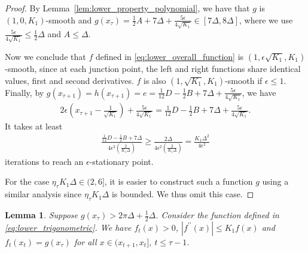 \documentclass{article}
\newtheorem{lemma}{Lemma}
\newcommand{\paren}[1]{\left( #1 \right)}
\begin{document}
\begin{proof}
By Lemma~\ref{lem:lower_property_polynomial}, 
we have that
$g$ is $(1,0,K_1)$-smooth and
$g(x_\tau)=\frac{1}{2}A+7\Delta+\frac{5\epsilon}{4\sqrt{K_1}}\in[7\Delta,8\Delta]$, where we use $\frac{5\epsilon}{4\sqrt{K_1}}\leq \frac{1}{2}\Delta$ and $A\leq\Delta$.

Now we conclude that $f$ defined in \eqref{eq:lower_overall_function} is $(1,\epsilon\sqrt{K_1},K_1)$-smooth,
since at each junction point,
the left and right functions share identical values, first and second derivatives.
$f$ is also $(1,\sqrt{K_1},K_1)$-smooth if $\epsilon\leq 1$.
Finally, by $g(x_{\tau+1})=h(x_{\tau+1})=e=\frac{1}{12}D-\frac{1}{2}B+7\Delta+\frac{5\epsilon}{4\sqrt{K_1}}$, we have
\begin{align*}
    2\epsilon\paren{x_{\tau+1}-\frac{1}{\sqrt{K_1}}}+\frac{5\epsilon}{4\sqrt{K_1}}=\frac{1}{12}D-\frac{1}{2}B+7\Delta+\frac{5\epsilon}{4\sqrt{K_1}}.
\end{align*}
It takes at least 
\begin{align*}
    \frac{\frac{1}{12}D-\frac{1}{2}B+7\Delta}{4\epsilon^2\paren{\frac{2}{K_1\Delta}}}\geq \frac{2\Delta}{4\epsilon^2\paren{\frac{2}{K_1\Delta}}}=\frac{K_1\Delta^2}{4\epsilon^2}
\end{align*}
iterations to reach an $\epsilon$-stationary point.


For the case $\eta_\tau K_1\Delta\in (2,6]$, it is easier to construct such a function $g$ using a similar analysis since $\eta_\tau K_1\Delta$ is bounded. We thus omit this case.

\end{proof}


\begin{lemma}\label{lem:lower_property_trigonometric}
    Suppose $g(x_\tau)>2\pi\Delta+\frac{1}{2}\Delta$.
    Consider the function defined in \eqref{eq:lower_trigonometric}. We have $f_t(x)>0$, 
    $\left|f^{\prime\prime}(x)\right|\leq K_1 f(x)$
    and
    $f_t(x_t)=g(x_\tau)$
    for all $x\in(x_{t+1},x_t]$, $t\leq \tau-1$.
\end{lemma}
\end{document}
